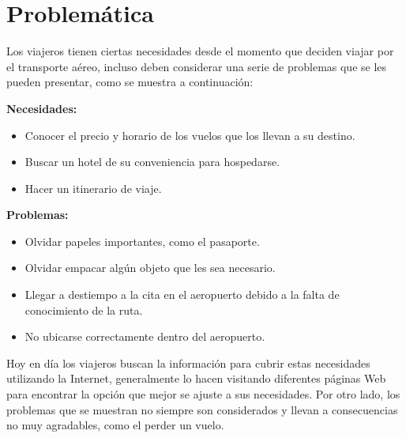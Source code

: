 \section{Problemática}

Los viajeros tienen ciertas necesidades desde el momento que deciden viajar por el transporte aéreo, incluso deben considerar una serie de problemas que se les pueden presentar, como se muestra a continuación:

\textbf{Necesidades:}

\begin{itemize}
	\item Conocer el precio y horario de los vuelos que los llevan a su destino.
	\item Buscar un hotel de su conveniencia para hospedarse.
	\item Hacer un itinerario de viaje.
\end{itemize}

\textbf{Problemas:}

\begin{itemize}
	\item Olvidar papeles importantes, como el pasaporte.
	\item Olvidar empacar algún objeto que les sea necesario.
	\item Llegar a destiempo a la cita en el aeropuerto debido a la falta de conocimiento de la ruta.
	\item No ubicarse correctamente dentro del aeropuerto.
\end{itemize}

Hoy en día los viajeros buscan la información para cubrir estas necesidades utilizando la Internet,  generalmente lo hacen visitando diferentes páginas Web para encontrar la opción que mejor se ajuste a sus necesidades. Por otro lado, los problemas que se muestran no siempre son considerados y llevan a consecuencias no muy agradables, como el perder un vuelo.